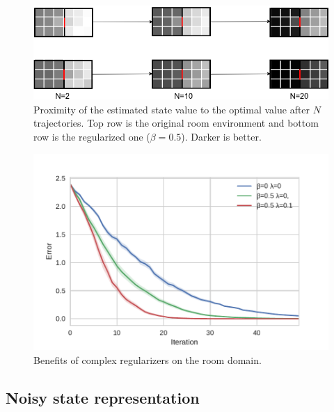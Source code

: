 \documentclass{article}
\newcommand{\param}{\beta}
\begin{document}
\begin{figure}
    \centering
    \includegraphics[scale=0.44]{room.png}
    \caption{Proximity of the estimated state value to the optimal value after $N$ trajectories. Top row is the original room environment and bottom row is the regularized one ($\param = 0.5$). Darker is better.}
    \label{fig:room}
\end{figure}
\begin{figure}[H]
\centering
\includegraphics[scale=0.60]{room_perf.pdf}
\caption{Benefits of complex regularizers on the room domain.}
\label{fig:room_perf}
\end{figure}



\subsection{Noisy state representation}
\label{sec:expe:noisy_state}
\end{document}
